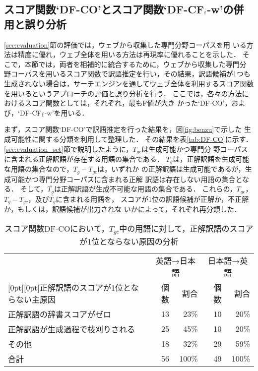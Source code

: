 \documentclass[japanese]{jnlp_1.3a}
\begin{document}
\subsection{スコア関数`DF-CO'とスコア関数`DF-CF${\rm _f}$-w'の併用と誤り分析}
\label{sec:error_analysis}


\ref{sec:evaluation}節の評価では，ウェブから収集した専門分野コーパスを用
いる方法は精度に優れ，ウェブ全体を用いる方法は再現率に優れることを示した．
そこで，本節では，両者を相補的に統合するために，ウェブから収集した専門分
野コーパスを用いるスコア関数で訳語推定を行い，その結果，訳語候補が1つも
生成されない場合は，サーチエンジンを通してウェブ全体を利用するスコア関数
を用いるというアプローチの評価と誤り分析を行う．
ここでは，各々の方法におけるスコア関数としては，それぞれ，最もF値が大き
かった`DF-CO'，および，`DF-CF${\rm _f}$-w'を用いる．

まず，スコア関数`DF-CO'で訳語推定を行った結果を，図\ref{fig:benzu}で示した
生成可能性に関する分類を利用して整理した．
その結果を表\ref{tab:DF-CO}に示す．
\ref{sec:evaluation_set}節で説明したように，$T_{gc}$は生成可能かつ専門分
野コーパスに含まれる正解訳語が存在する用語の集合である．
$T_g$は，正解訳語を生成可能な用語の集合なので，$T_g-T_{gc}$は，いずれか
の正解訳語は生成可能であるが，生成可能かつ専門分野コーパスに含まれる正解
訳語は存在しない用語の集合となる．
そして，$\overline{T_g}$は正解訳語が生成不可能な用語の集合である．
これらの，$T_{gc}$，$T_g-T_{gc}$，及び$\overline{T_g}$に含まれる用語を，
スコアが1位の訳語候補が正解か，不正解か，もしくは，訳語候補が出力されな
いかによって，それぞれ再分類した．

\begin{table}[b]
 \small
 \centering
 \caption{スコア関数DF-COにおいて，$T_{gc}$中の用語に対して，正解訳語のスコアが1位とならない原因の\hspace*{32pt}分析}
 \label{tab:sukoa-make}
 \begin{tabular}{|l|r|r|r|r|}
  \hline
  & \multicolumn{2}{|c|}{英語→日本語} & \multicolumn{2}{|c|}{日本語→英語}\\
      \cline{2-5}
      \raisebox{0.5\normalbaselineskip}[0pt][0pt]{正解訳語のスコアが1位とならない主原因} 
	& 個数 & 割合 & 個数 & 割合\\
  \hline
  正解訳語の辞書スコアがゼロ & 13 & 23\% & 10 & 20\% \\
  正解訳語が生成過程で枝刈りされる & 25 & 45\% & 10 & 20\% \\
  その他 & 18 & 32\% & 29 & 59\%\\
  \hline
  合計 & 56 & 100\% & 49 & 100\% \\
  \hline
 \end{tabular}
\end{table}
\end{document}
